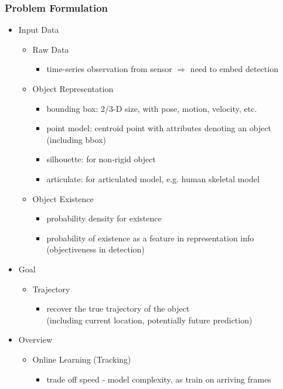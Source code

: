 \subsubsection{Problem Formulation}
\begin{itemize}
\item Input Data
	\begin{itemize}
	\item Raw Data
		\begin{itemize}
		\item time-series observation from sensor $\Rightarrow$ need to embed detection
		\end{itemize}
	\item Object Representation
		\begin{itemize}
		\item bounding box: 2/3-D size, with pose, motion, velocity, etc.
		\item point model: centroid point with attributes denoting an object (including bbox)
		\item silhouette: for non-rigid object
		\item articulate: for articulated model, e.g. human skeletal model
		\end{itemize}
	\item Object Existence
		\begin{itemize}
		\item probability density for existence
		\item probability of existence as a feature in representation info \\
		(objectiveness in detection)
		\end{itemize}
	\end{itemize}
\item Goal
	\begin{itemize}
	\item Trajectory
		\begin{itemize}
		\item recover the true trajectory of the object \\ 
		(including current location, potentially future prediction)
		\end{itemize}
	\end{itemize}
\item Overview
	\begin{itemize}
	\item Online Learning (Tracking)
		\begin{itemize}
		\item trade off speed - model complexity, as train on arriving frames

\end{itemize}
\end{itemize}
\end{itemize}

